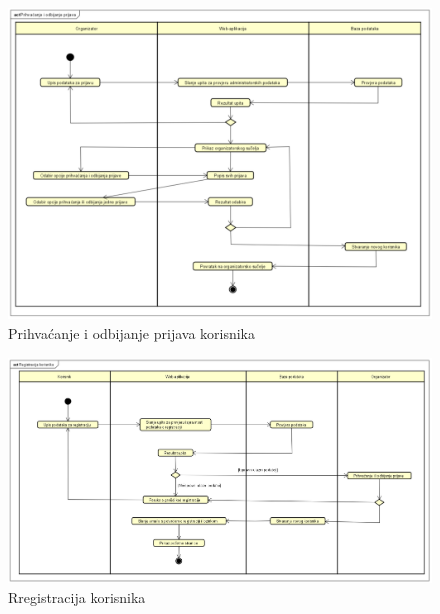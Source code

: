 \begin{figure}[H]
	\includegraphics[scale=0.75]{dokumentacija/dijagrami/activity-prihvacanjeOdbijanjePrijava.PNG} 
	\centering
	\caption{Prihvaćanje i odbijanje prijava korisnika}
	\label{fig:promjene}
\end{figure}

\begin{figure}[H]
	\includegraphics[scale=0.5]{dokumentacija/dijagrami/activity-registracijaKorisnika.PNG} 
	\centering
	\caption{Rregistracija korisnika}
	\label{fig:promjene}
\end{figure}

